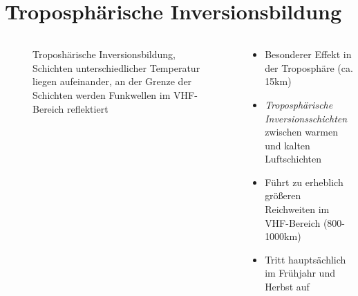 
\section{Troposphärische Inversionsbildung}
\label{section:troposphaere}
\begin{frame}%

\begin{columns}
    \begin{column}{0.48\textwidth}
    
\begin{figure}
    \caption{\scriptsize Troposhärische Inversionsbildung, Schichten unterschiedlicher Temperatur liegen aufeinander, an der Grenze der Schichten werden Funkwellen im VHF-Bereich reflektiert}
    \label{n_tropo}
\end{figure}


    \end{column}
   \begin{column}{0.48\textwidth}
       \begin{itemize}
  \item Besonderer Effekt in der Troposphäre (ca. 15km)
  \item \emph{Troposphärische Inversionsschichten} zwischen warmen und kalten Luftschichten
  \item Führt zu erheblich größeren Reichweiten im VHF-Bereich (800-1000km)
  \item Tritt hauptsächlich im Frühjahr und Herbst auf
  \end{itemize}

   \end{column}
\end{columns}

\end{frame}

\begin{frame}
\end{frame}%
